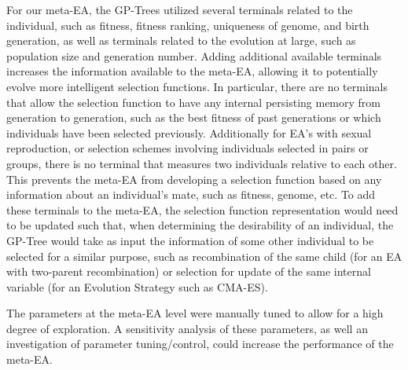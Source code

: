 \documentclass[sigconf]{acmart}
\begin{document}
For our meta-EA, the GP-Trees utilized several terminals related to the individual, such as fitness, fitness ranking, uniqueness of genome, and birth generation, as well as terminals related to the evolution at large, such as population size and generation number. Adding additional available terminals increases the information available to the meta-EA, allowing it to potentially evolve more intelligent selection functions. In particular, there are no terminals that allow the selection function to have any internal persisting memory from generation to generation, such as the best fitness of past generations or which individuals have been selected previously. Additionally for EA's with sexual reproduction, or selection schemes involving individuals selected in pairs or groups, there is no terminal that measures two individuals relative to each other. This prevents the meta-EA from developing a selection function based on any information about an individual's mate, such as fitness, genome, etc. To add these terminals to the meta-EA, the selection function representation would need to be updated such that, when determining the desirability of an individual, the GP-Tree would take as input the information of some other individual to be selected for a similar purpose, such as recombination of the same child (for an EA with two-parent recombination) or selection for update of the same internal variable (for an Evolution Strategy such as CMA-ES).

The parameters at the meta-EA level were manually tuned to allow for a high degree of exploration. A sensitivity analysis of these parameters, as well an investigation of parameter tuning/control, could increase the performance of the meta-EA.


 
\end{document}
